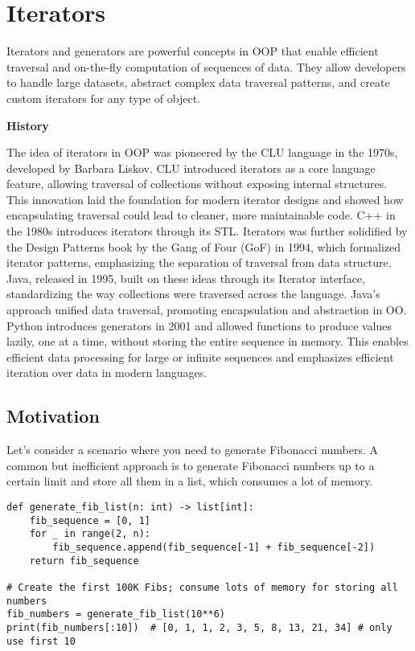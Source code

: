 \documentclass[oneside,11pt,dvipsnames]{book}
\newenvironment{historybox}[1][]{
  \small
  \begin{myhistorybox}
    {\small \textbf{#1}}
  }{
  \end{myhistorybox}
}
\begin{document}
\chapter{Iterators}
Iterators and generators are powerful concepts in OOP that enable efficient traversal and on-the-fly computation of sequences of data. They allow developers to handle large datasets, abstract complex data traversal patterns, and create custom iterators for any type of object. 

\begin{historybox}[History]
    The idea of iterators in OOP was pioneered by the CLU language in the 1970s, developed by Barbara Liskov. CLU introduced iterators as a core language feature, allowing traversal of collections without exposing internal structures. This innovation laid the foundation for modern iterator designs and showed how encapsulating traversal could lead to cleaner, more maintainable code. C++ in the 1980s introduces iterators through its STL. Iterators was further solidified by the Design Patterns book by the Gang of Four (GoF) in 1994, which formalized iterator patterns, emphasizing the separation of traversal from data structure.\\
    
    Java, released in 1995, built on these ideas through its Iterator interface, standardizing the way collections were traversed across the language. Java's approach unified data traversal, promoting encapsulation and abstraction in OO. Python introduces generators in 2001 and allowed functions to produce values lazily, one at a time, without storing the entire sequence in memory.  This enables efficient data processing for large or infinite sequences and emphasizes efficient iteration over data in modern languages.
\end{historybox}
\section{Motivation}
Let’s consider a scenario where you need to generate Fibonacci numbers. A common but inefficient approach is to generate Fibonacci numbers up to a certain limit and store all them in a list, which consumes a lot of memory.

\begin{lstlisting}
def generate_fib_list(n: int) -> list[int]:
    fib_sequence = [0, 1]
    for _ in range(2, n):
        fib_sequence.append(fib_sequence[-1] + fib_sequence[-2])
    return fib_sequence

# Create the first 100K Fibs; consume lots of memory for storing all numbers
fib_numbers = generate_fib_list(10**6)  
print(fib_numbers[:10])  # [0, 1, 1, 2, 3, 5, 8, 13, 21, 34] # only use first 10
\end{lstlisting}
\end{document}
